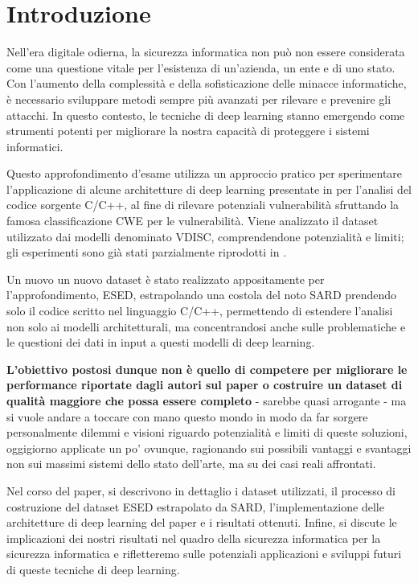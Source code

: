 \documentclass[conference]{IEEEtran}
\begin{document}
\section{Introduzione}

Nell'era digitale odierna, la sicurezza informatica non può non essere considerata come una questione vitale per l'esistenza di un'azienda, un ente e di uno stato. Con l'aumento della complessità e della sofisticazione delle minacce informatiche, è necessario sviluppare metodi sempre più avanzati per rilevare e prevenire gli attacchi. In questo contesto, le tecniche di deep learning stanno emergendo come strumenti potenti per migliorare la nostra capacità di proteggere i sistemi informatici.

Questo approfondimento d'esame utilizza un approccio pratico per sperimentare l'applicazione di alcune architetture di deep learning presentate in \cite{russell2018automatedvulnerabilitydetectionsource} per l'analisi del codice sorgente C/C++, al fine di rilevare potenziali vulnerabilità sfruttando la famosa classificazione CWE\cite{cwe} per le vulnerabilità. Viene analizzato il dataset utilizzato dai modelli denominato VDISC, comprendendone potenzialità e limiti; gli esperimenti sono già stati parzialmente riprodotti in \cite{Ykartal2024}. 

Un nuovo un nuovo dataset è stato realizzato appositamente per l'approfondimento, ESED, estrapolando una costola del noto SARD prendendo solo il codice scritto nel linguaggio C/C++, permettendo di estendere l'analisi non solo ai modelli architetturali, ma concentrandosi anche sulle problematiche e le questioni dei dati in input a questi modelli di deep learning.

\textbf{L'obiettivo postosi dunque non è quello di competere per migliorare le performance riportate dagli autori sul paper o costruire un dataset di qualità maggiore che possa essere completo} - sarebbe quasi arrogante - ma si vuole andare a toccare con mano questo mondo in modo da far sorgere personalmente dilemmi e visioni riguardo potenzialità e limiti di queste soluzioni, oggigiorno applicate un po' ovunque, ragionando sui possibili vantaggi e svantaggi non sui massimi sistemi dello stato dell'arte, ma su dei casi reali affrontati.

Nel corso del paper, si descrivono in dettaglio i dataset utilizzati, il processo di costruzione del dataset ESED estrapolato da SARD, l'implementazione delle architetture di deep learning del paper e i risultati ottenuti. Infine, si discute le implicazioni dei nostri risultati nel quadro della sicurezza informatica per la sicurezza informatica e rifletteremo sulle potenziali applicazioni e sviluppi futuri di queste tecniche di deep learning.
\end{document}
